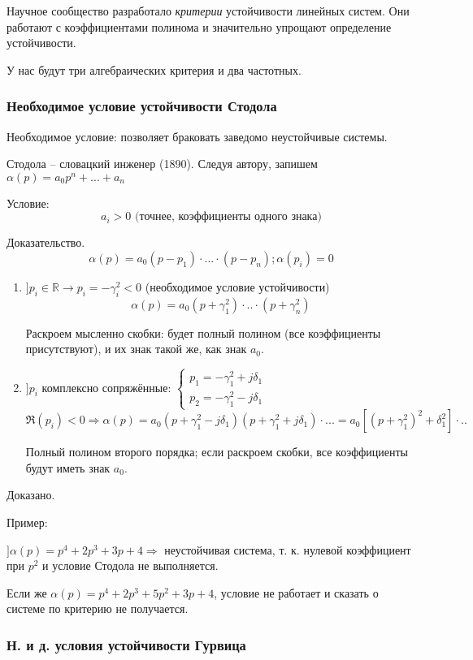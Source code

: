 \documentclass[main.tex]{subfiles}
\begin{document}
Научное сообщество разработало \emph{критерии} устойчивости линейных систем.
Они работают с коэффициентами полинома и значительно упрощают определение устойчивости.

У нас будут три алгебраических критерия и два частотных.

\subsubsection{Необходимое условие устойчивости Стодола}
Необходимое условие: позволяет браковать заведомо неустойчивые системы.

Стодола -- словацкий инженер (1890).
Следуя автору, запишем $\alpha(p) = a_0 p^n + ... + a_n $

Условие:
$$\boxed{a_i > 0} \text{ (точнее, коэффициенты одного знака)}$$

Доказательство.
$$ \alpha(p) = a_0 (p-p_1) \cdot ... \cdot (p - p_n); \alpha(p_i) = 0 $$

\begin{enumerate}[noitemsep]
	\item $ ] p_i \in \mathds{R} \to p_i = - \gamma_i^2 < 0 $ (необходимое условие устойчивости)
	$$ \alpha(p) = a_0(p+\gamma_1^2) \cdot .. \cdot (p + \gamma_n^2) $$

	Раскроем мысленно скобки: будет полный полином (все коэффициенты присутствуют), и их знак такой же, как знак $a_0$.
	\item $ ] p_i$  комплексно сопряжённые: $\begin{cases}
        p_1 = - \gamma_1^2 + j \delta_1 \\
        p_2 = - \gamma_1^2 - j \delta_1
    \end{cases} $
    $$ \Re(p_i) < 0 \Rightarrow \alpha(p) = a_0(p + \gamma_1^2 - j \delta_1)(p + \gamma_1^2 + j \delta_1) \cdot ... = a_0 [(p + \gamma_1^2)^2 + \delta_1^2] \cdot .. $$


	Полный полином второго порядка; если раскроем скобки, все коэффициенты будут иметь знак $a_0$.
\end{enumerate}
Доказано.

Пример:

$ ] \alpha(p) = p^4 + 2 p^3 + 3p + 4 \Rightarrow $ неустойчивая система, т. к. нулевой коэффициент при $ p^2 $ и условие Стодола не выполняется.

Если же $ \alpha(p) = p^4 + 2 p^3 + 5 p^2 + 3p + 4 $, условие не работает и сказать о системе по критерию не получается.

\subsubsection{Н. и д. условия устойчивости Гурвица}
\end{document}
